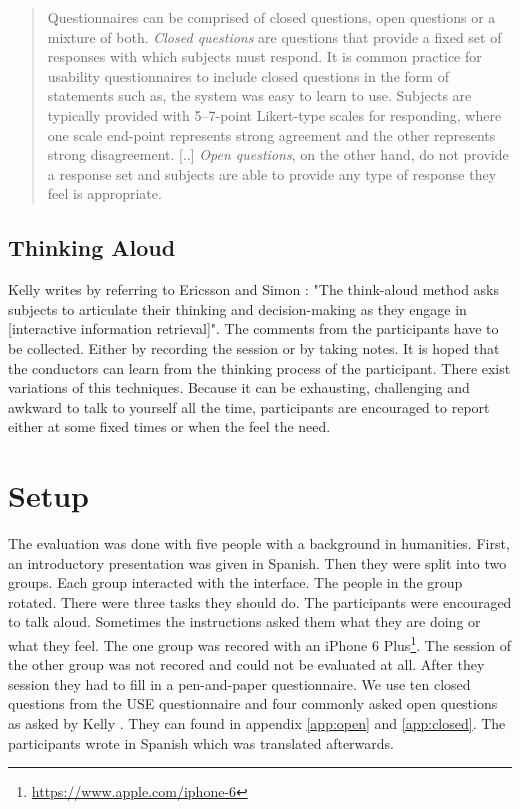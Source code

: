 \documentclass[11pt]{report}
\begin{document}
\begin{quote}
	Questionnaires can be comprised of closed questions, open questions or a mixture of both. \textit{Closed questions} are questions that provide a fixed set of responses with which subjects must respond. It is common practice for usability questionnaires to include closed questions in the form of statements such as, the system was easy to learn to use. Subjects are typically provided with 5–7-point Likert-type scales for responding, where one scale end-point represents strong agreement and the other represents strong disagreement. [..] \textit{Open questions}, on the other hand, do not provide a response set and subjects are able to provide any type of response they feel is appropriate. 
	\end{quote}


\subsection{Thinking Aloud}

Kelly \cite{Kelly2007} writes by referring to Ericsson and Simon \cite{Ericsson1993}: "The think-aloud method asks subjects to articulate their thinking and decision-making as they engage in [interactive information retrieval]". The comments from the participants have to be collected. Either by recording the session or by taking notes. It is hoped that the conductors can learn from the thinking process of the participant. There exist variations of this techniques. Because it can be exhausting, challenging and awkward to talk to yourself all the time, participants are encouraged to report either at some fixed times or when the feel the need.

\section{Setup}

The evaluation was done with five people with a background in humanities. First, an introductory presentation was given in Spanish. Then they were split into two groups. Each group interacted with the interface. The people in the group rotated. There were three tasks they should do. The participants were encouraged to talk aloud. Sometimes the instructions asked them what they are doing or what they feel. The one group was recored with an iPhone 6 Plus\footnote{\url{https://www.apple.com/iphone-6}}. The session of the other group was not recored and could not be evaluated at all. After they session they had to fill in a pen-and-paper questionnaire. We use ten closed questions from the USE questionnaire \cite{lund2001measuring} and four commonly asked open questions as asked by Kelly \cite{Kelly2008}. They can found in appendix \ref{app:open} and \ref{app:closed}. The participants wrote in Spanish which was translated afterwards.
\end{document}

